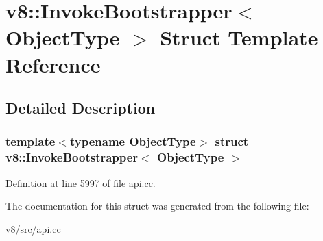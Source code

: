 \hypertarget{structv8_1_1InvokeBootstrapper}{}\section{v8\+:\+:Invoke\+Bootstrapper$<$ Object\+Type $>$ Struct Template Reference}
\label{structv8_1_1InvokeBootstrapper}


\subsection{Detailed Description}
\subsubsection*{template$<$typename Object\+Type$>$\newline
struct v8\+::\+Invoke\+Bootstrapper$<$ Object\+Type $>$}



Definition at line 5997 of file api.\+cc.



The documentation for this struct was generated from the following file\+:\begin{DoxyCompactItemize}
\item 
v8/src/api.\+cc\end{DoxyCompactItemize}
